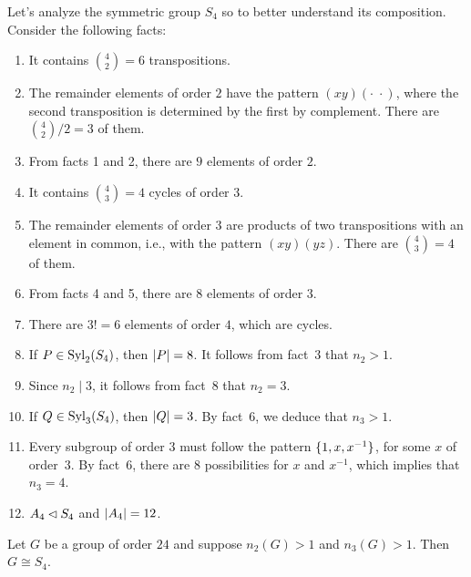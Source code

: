 \begin{xmpl}
    Let's analyze the symmetric group $S_4$ so to better understand its composition. Consider the following facts:
    \begin{enumerate}[\rm 1.]
        \item It contains $\binom42=6$ transpositions.
        \item The remainder elements of order $2$ have the pattern $(xy)(\cdot\;\cdot)$, where the second transposition is determined by the first by complement. There are $\binom42/2=3$ of them.
        \item From facts {\rm1} and {\rm2}, there are $9$ elements of order $2$.
        \item It contains $\binom43=4$ cycles of order $3$.
        \item The remainder elements of order $3$ are products of two transpositions with an element in common, i.e., with the pattern $(xy)(yz)$. There are $\binom43=4$ of them.
        \item From facts {\rm4} and {\rm5}, there are $8$ elements of order $3$.
        \item There are $3!=6$ elements of order $4$, which are cycles.
        \item If $P\in{\rm Syl}_2(S_4)$, then $\left\vert{P}\right\vert=8$. It follows from fact~{\rm3} that $n_2>1$.
        \item Since $n_2\mid 3$, it follows from fact~{\rm8} that $n_2=3$.
        \item If $Q\in{\rm Syl}_3(S_4)$, then $\left\vert{Q}\right\vert=3$. By fact~{\rm6}, we deduce that $n_3>1$.
        \item Every subgroup of order $3$ must follow the pattern $\{1,x,x^{-1}\}$, for some\/ $x$ of order\/~$3$. By fact~{\rm6}, there are\/ $8$ possibilities for\/ $x$ and\/ $x^{-1}$, which implies that\/ $n_3=4$.
        \item $A_4\lhd S_4$ and $\left\vert{A_4}\right\vert=12$.
    \end{enumerate}
\end{xmpl}

\begin{thm}\label{thm-24}
    Let\/ $G$ be a group of order $24$ and suppose\/ $n_2(G)>1$ and\/ $n_3(G)>1$. Then $G\cong S_4$.
\end{thm}

